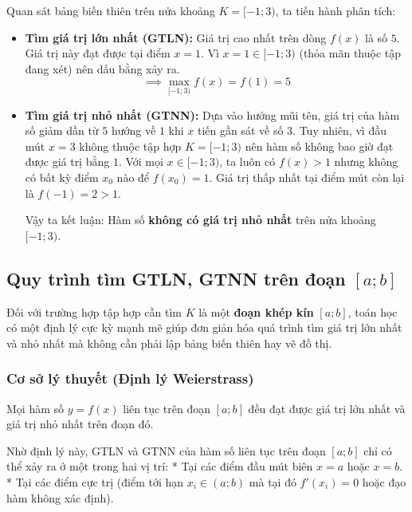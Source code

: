 \documentclass[12pt]{article}
\begin{document}
	\begin{loigiai}
		Quan sát bảng biến thiên trên nửa khoảng $K = [-1; 3)$, ta tiến hành phân tích:
		\begin{itemize}
			\item \textbf{Tìm giá trị lớn nhất (GTLN):} 
			Giá trị cao nhất trên dòng $f(x)$ là số $5$. Giá trị này đạt được tại điểm $x = 1$.
			Vì $x = 1 \in [-1; 3)$ (thỏa mãn thuộc tập đang xét) nên dấu bằng xảy ra.
			$$\implies \max_{[-1; 3)} f(x) = f(1) = 5$$
			
			\item \textbf{Tìm giá trị nhỏ nhất (GTNN):} 
			Dựa vào hướng mũi tên, giá trị của hàm số giảm dần từ $5$ hướng về $1$ khi $x$ tiến gần sát về số $3$.
			Tuy nhiên, vì đầu mút $x = 3$ không thuộc tập hợp $K = [-1; 3)$ nên hàm số không bao giờ đạt được giá trị bằng $1$.
			Với mọi $x \in [-1; 3)$, ta luôn có $f(x) > 1$ nhưng không có bất kỳ điểm $x_0$ nào để $f(x_0) = 1$. Giá trị thấp nhất tại điểm mút còn lại là $f(-1) = 2 > 1$.
			
			Vậy ta kết luận: Hàm số \textbf{không có giá trị nhỏ nhất} trên nửa khoảng $[-1; 3)$.
		\end{itemize}
	\end{loigiai}
	
	
	\subsection{Quy trình tìm GTLN, GTNN trên đoạn $[a; b]$}
	
	Đối với trường hợp tập hợp cần tìm $K$ là một \textbf{đoạn khép kín} $[a; b]$, toán học có một định lý cực kỳ mạnh mẽ giúp đơn giản hóa quá trình tìm giá trị lớn nhất và nhỏ nhất mà không cần phải lập bảng biến thiên hay vẽ đồ thị.
	
	\subsubsection{Cơ sở lý thuyết (Định lý Weierstrass)}
	\begin{tcolorbox}[colback=blue!5!white, colframe=blue!60!black, title=Định lý Weierstrass]
		Mọi hàm số $y = f(x)$ liên tục trên đoạn $[a; b]$ đều đạt được giá trị lớn nhất và giá trị nhỏ nhất trên đoạn đó.
	\end{tcolorbox}
	
	Nhờ định lý này, GTLN và GTNN của hàm số liên tục trên đoạn $[a; b]$ chỉ có thể xảy ra ở một trong hai vị trí:
	*   Tại các điểm đầu mút biên $x = a$ hoặc $x = b$.
	*   Tại các điểm cực trị (điểm tới hạn $x_i \in (a; b)$ mà tại đó $f'(x_i) = 0$ hoặc đạo hàm không xác định).
	
\end{document}
